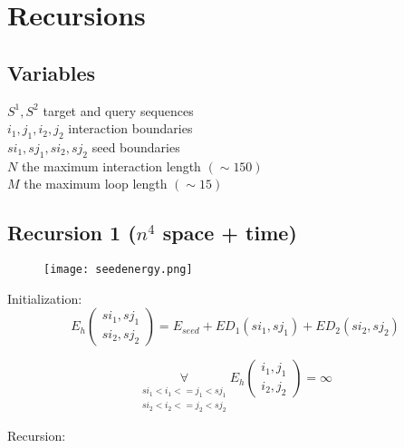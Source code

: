 \section{Recursions}

\subsection{Variables}

$S^1, S^2$ target and query sequences\\
$i_1, j_1, i_2, j_2$ interaction boundaries\\
$si_1, sj_1, si_2, sj_2$ seed boundaries\\
$N$ the maximum interaction length $(\sim 150)$\\
$M$ the maximum loop length $(\sim 15)$

\subsection{Recursion 1 ($n^{4}$ space + time)}

\begin{figure}[H]
	\centering
	\texttt{[image: seedenergy.png]}
\end{figure}

Initialization:\\

\begin{equation*}
E_h(\substack{si_1,sj_1\\si_2,sj_2}) = E_{seed} + ED_{1}(si_{1}, sj_{1}) + ED_{2}(si_{2},sj_{2})
\end{equation*}

\begin{equation*}
\underset{{\substack{si_1 < i_{1} <= j_{1} < sj_{1}\\si_2 < i_{2} <= j_{2} < sj_{2}}}}{\forall} E_h(\substack{i_1,j_1\\i_2,j_2}) = \infty
\end{equation*}

Recursion:\\

